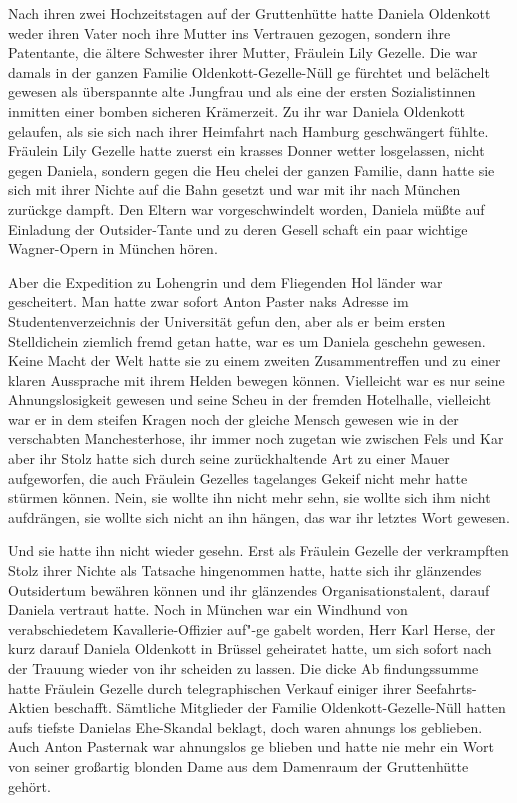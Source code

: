 Nach ihren zwei Hochzeitstagen auf der Gruttenhütte hatte
Daniela Oldenkott weder ihren Vater noch ihre Mutter ins
Vertrauen gezogen, sondern ihre Patentante, die ältere
Schwester ihrer Mutter, Fräulein Lily Gezelle. Die war
damals in der ganzen Familie Oldenkott-Gezelle-Nüll ge\-%
fürchtet und belächelt gewesen als überspannte alte Jungfrau
und als eine der ersten Sozialistinnen inmitten einer bomben\-%
sicheren Krämerzeit. Zu ihr war Daniela Oldenkott gelaufen,
als sie sich nach ihrer Heimfahrt nach Hamburg geschwängert
fühlte. Fräulein Lily Gezelle hatte zuerst ein krasses Donner\-%
wetter losgelassen, nicht gegen Daniela, sondern gegen die Heu\-%
chelei der ganzen Familie, dann hatte sie sich mit ihrer Nichte
auf die Bahn gesetzt und war mit ihr nach München zurückge\-%
dampft. Den Eltern war vorgeschwindelt worden, Daniela
müßte auf Einladung der Outsider-Tante und zu deren Gesell\-%
schaft ein paar wichtige Wagner-Opern in München hören.

Aber die Expedition zu Lohengrin und dem Fliegenden Hol\-%
länder war gescheitert. Man hatte zwar sofort Anton Paster\-%
naks Adresse im Studentenverzeichnis der Universität gefun\-%
den, aber als er beim ersten Stelldichein ziemlich fremd getan
hatte, war es um Daniela geschehn gewesen. Keine Macht der
Welt hatte sie zu einem zweiten Zusammentreffen und zu
einer klaren Aussprache mit ihrem Helden bewegen können.
Vielleicht war es nur seine Ahnungslosigkeit gewesen und seine
Scheu in der fremden Hotelhalle, vielleicht war er in dem
steifen Kragen noch der gleiche Mensch gewesen wie in der
verschabten Manchesterhose, ihr immer noch zugetan wie
zwischen Fels und Kar\dopp{} aber ihr Stolz hatte sich durch seine
zurückhaltende Art zu einer Mauer aufgeworfen, die auch
Fräulein Gezelles tagelanges Gekeif nicht mehr hatte stürmen
können. Nein, sie wollte ihn nicht mehr sehn, sie wollte sich
ihm nicht aufdrängen, sie wollte sich nicht an ihn hängen,
das war ihr letztes Wort gewesen.

Und sie hatte ihn nicht wieder gesehn. Erst als Fräulein
Gezelle der verkrampften Stolz ihrer Nichte als Tatsache
hingenommen hatte, hatte sich ihr glänzendes Outsidertum
bewähren können und ihr glänzendes Organisationstalent,
darauf Daniela vertraut hatte. Noch in München war ein
Windhund von verabschiedetem Kavallerie-Offizier auf"-ge\-%
gabelt worden, Herr Karl Herse, der kurz darauf Daniela
Oldenkott in Brüssel geheiratet hatte, um sich sofort nach der
Trauung wieder von ihr scheiden zu lassen. Die dicke Ab\-%
findungssumme hatte Fräulein Gezelle durch telegraphischen
Verkauf einiger ihrer Seefahrts-Aktien beschafft. Sämtliche
Mitglieder der Familie Oldenkott-Gezelle-Nüll hatten aufs
tiefste Danielas Ehe-Skandal beklagt, doch waren ahnungs\-%
los geblieben. Auch Anton Pasternak war ahnungslos ge\-%
blieben und hatte nie mehr ein Wort von seiner großartig
blonden Dame aus dem Damenraum der Gruttenhütte
gehört.


